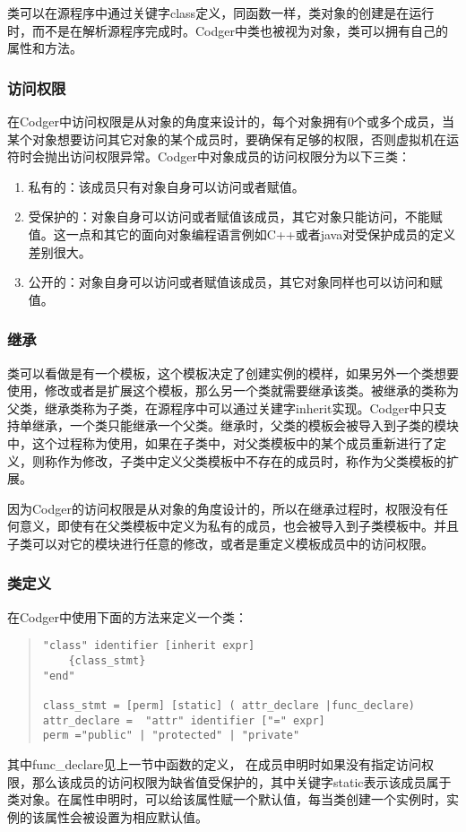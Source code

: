 类可以在源程序中通过关键字class定义，同函数一样，类对象的创建是在运行时，而不是在解析源程序完成时。Codger中类也被视为对象，类可以拥有自己的属性和方法。
\subsubsection{访问权限}
在Codger中访问权限是从对象的角度来设计的，每个对象拥有0个或多个成员，当某个对象想要访问其它对象的某个成员时，要确保有足够的权限，否则虚拟机在运符时会抛出访问权限异常。Codger中对象成员的访问权限分为以下三类：
\begin{enumerate}
\item 私有的：该成员只有对象自身可以访问或者赋值。
\item 受保护的：对象自身可以访问或者赋值该成员，其它对象只能访问，不能赋值。这一点和其它的面向对象编程语言例如C++或者java对受保护成员的定义差别很大。
\item 公开的：对象自身可以访问或者赋值该成员，其它对象同样也可以访问和赋值。
\end{enumerate}

\subsubsection{继承}
类可以看做是有一个模板，这个模板决定了创建实例的模样，如果另外一个类想要使用，修改或者是扩展这个模板，那么另一个类就需要继承该类。被继承的类称为父类，继承类称为子类，在源程序中可以通过关建字inherit实现。Codger中只支持单继承，一个类只能继承一个父类。继承时，父类的模板会被导入到子类的模块中，这个过程称为使用，如果在子类中，对父类模板中的某个成员重新进行了定义，则称作为修改，子类中定义父类模板中不存在的成员时，称作为父类模板的扩展。

因为Codger的访问权限是从对象的角度设计的，所以在继承过程时，权限没有任何意义，即使有在父类模板中定义为私有的成员，也会被导入到子类模板中。并且子类可以对它的模块进行任意的修改，或者是重定义模板成员中的访问权限。

\subsubsection{类定义}
在Codger中使用下面的方法来定义一个类：
\begin{quote}
\begin{verbatim}
"class" identifier [inherit expr]
    {class_stmt}
"end"

class_stmt = [perm] [static] ( attr_declare |func_declare)
attr_declare =  "attr" identifier ["=" expr] 
perm ="public" | "protected" | "private"
\end{verbatim}
\end{quote}
其中func\_declare见上一节中函数的定义， 在成员申明时如果没有指定访问权限，那么该成员的访问权限为缺省值受保护的，其中关键字static表示该成员属于类对象。在属性申明时，可以给该属性赋一个默认值，每当类创建一个实例时，实例的该属性会被设置为相应默认值。

